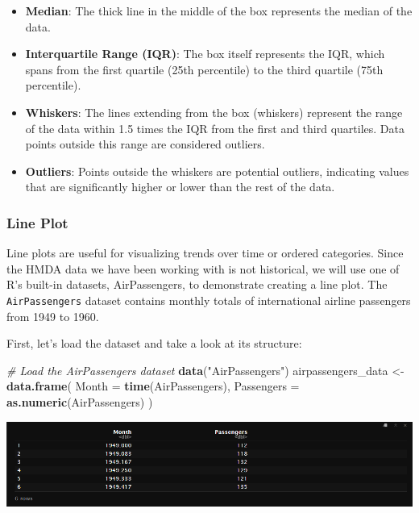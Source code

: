 \documentclass[
]{book}
\newenvironment{Shaded}{\begin{snugshade}}{\end{snugshade}}
\newcommand{\AttributeTok}[1]{\textcolor[rgb]{0.13,0.29,0.53}{#1}}
\newcommand{\CommentTok}[1]{\textcolor[rgb]{0.56,0.35,0.01}{\textit{#1}}}
\newcommand{\FunctionTok}[1]{\textcolor[rgb]{0.13,0.29,0.53}{\textbf{#1}}}
\newcommand{\NormalTok}[1]{#1}
\newcommand{\OtherTok}[1]{\textcolor[rgb]{0.56,0.35,0.01}{#1}}
\newcommand{\StringTok}[1]{\textcolor[rgb]{0.31,0.60,0.02}{#1}}
\begin{document}
\begin{itemize}
\item
  \textbf{Median}: The thick line in the middle of the box represents the median of the data.
\item
  \textbf{Interquartile Range (IQR)}: The box itself represents the IQR, which spans from the first quartile (25th percentile) to the third quartile (75th percentile).
\item
  \textbf{Whiskers}: The lines extending from the box (whiskers) represent the range of the data within 1.5 times the IQR from the first and third quartiles. Data points outside this range are considered outliers.
\item
  \textbf{Outliers}: Points outside the whiskers are potential outliers, indicating values that are significantly higher or lower than the rest of the data.
\end{itemize}

\hypertarget{line-plot}{%
\subsubsection*{Line Plot}\label{line-plot}}

Line plots are useful for visualizing trends over time or ordered categories. Since the HMDA data we have been working with is not historical, we will use one of R's built-in datasets, AirPassengers, to demonstrate creating a line plot. The \texttt{AirPassengers} dataset contains monthly totals of international airline passengers from 1949 to 1960.

First, let's load the dataset and take a look at its structure:

\begin{Shaded}
\begin{Highlighting}[]
\CommentTok{\# Load the AirPassengers dataset}
\FunctionTok{data}\NormalTok{(}\StringTok{"AirPassengers"}\NormalTok{)}
\NormalTok{airpassengers\_data }\OtherTok{\textless{}{-}} \FunctionTok{data.frame}\NormalTok{(}
  \AttributeTok{Month =} \FunctionTok{time}\NormalTok{(AirPassengers),}
  \AttributeTok{Passengers =} \FunctionTok{as.numeric}\NormalTok{(AirPassengers)}
\NormalTok{)}
\end{Highlighting}
\end{Shaded}

\includegraphics{images/airplane_table_head.PNG}
\end{document}
